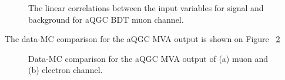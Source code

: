 \begin{figure}[]
  \begin{center}
    \caption{ The linear correlations between the input variables for signal and background for aQGC BDT muon channel. }
    \label{fig:corrAQGCmu}
  \end{center}
\end{figure}

The data-MC comparison for the aQGC MVA output is shown on Figure ~\ref{fig:outaQGCmu}

\begin{figure}[b]
  \begin{center}
    \caption{ Data-MC comparison for the aQGC MVA output of (a) muon and (b) electron channel. }
    \label{fig:outaQGCmu}
  \end{center}
\end{figure}

